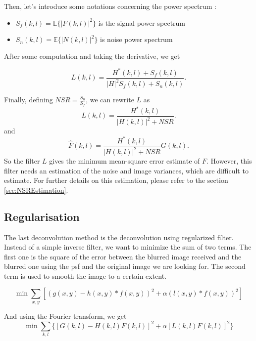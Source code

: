 Then, let's introduce some notations concerning the power spectrum :
\begin{itemize}
\item $S_f(k,l) = \mathbb{E}\{|F(k,l)|^2\}$ is the signal power spectrum
\item $S_n(k,l) = \mathbb{E}\{|N(k,l)|^2\}$ is noise power spectrum 
\end{itemize}

After some computation and taking the derivative, we get

\begin{equation}
L(k,l)= \frac{H^*(k,l)+S_f(k,l)}{|H|^2 S_f(k,l) + S_n(k,l)}.
\label{eq:LsemiFinal}
\end{equation}

Finally, defining $NSR = \frac{S_n}{S_f}$, we can rewrite $L$ as 
\begin{equation}
L (k,l)= \frac{H^*(k,l)}{|H(k,l)|^2 + NSR}.
\end{equation}
and 
\begin{equation}
 \hat{F}(k,l) = \frac{H^*(k,l)}{|H(k,l)|^2 + NSR} G(k,l).
\end{equation}
So the filter $L$ gives the minimum mean-square error estimate of $F$.
However, this filter needs an estimation of the noise and image variances, which are difficult to estimate. For further details on this estimation, please refer to the section \ref{sec:NSREstimation}.

\subsection{Regularisation}
\label{subsec:Reg}
The last deconvolution method is the deconvolution using regularized filter. 
Instead of a simple inverse filter, we want to minimize the sum of two terms. The first one is the square of the error between the blurred image received and the blurred one using the psf and the original image we are looking for. The second term is used to smooth the image to a certain extent. 

\begin{equation}
\min \sum_{x,y} \left[ (g(x,y) - h(x,y)*f(x,y))^2 + \alpha (l(x,y)*f(x,y))^2 \right]
\end{equation}

And using the Fourier transform, we get
\begin{equation}
\min \sum_{k,l} \{ [G(k,l) - H(k,l)F(k,l)]^2 + \alpha [L(k,l)F(k,l)]^2\}
\label{eq:FTreg}
\end{equation}

